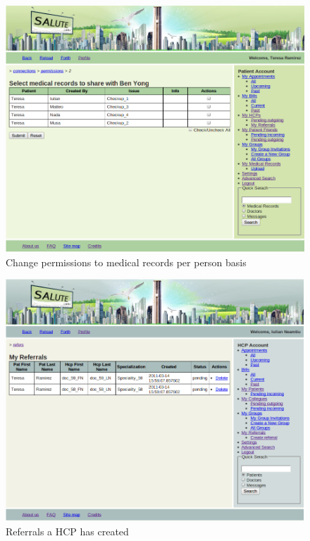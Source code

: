 \begin{figure}
\includegraphics[scale=0.5]{screenshots/change_permission_to_medical_records_per_person.png}
\caption{Change permissions to medical records per person basis}
\end{figure}

\begin{figure}
\includegraphics[scale=0.5]{screenshots/my_referrals.png}
\caption{Referrals a HCP has created}
\end{figure}

